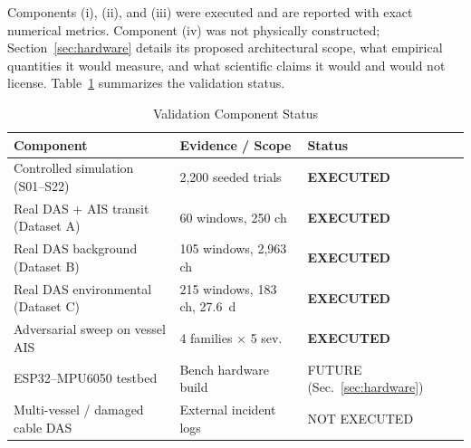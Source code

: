 \documentclass[conference]{IEEEtran}
\begin{document}
Components (i), (ii), and (iii) were executed and are reported with exact
numerical metrics. Component (iv) was not physically constructed;
Section~\ref{sec:hardware} details its proposed architectural scope, what
empirical quantities it would measure, and what scientific claims it would and
would not license. Table~\ref{tab:status} summarizes the validation status.

\begin{table}[!t]
\caption{Validation Component Status}
\label{tab:status}
\centering
\footnotesize
\begin{tabular}{@{}p{}p{}l@{}}
\toprule
Component & Evidence / Scope & Status \\
\midrule
Controlled simulation (S01--S22) & 2{,}200 seeded trials & \textbf{EXECUTED} \\
Real DAS + AIS transit (Dataset A) & 60 windows, 250 ch & \textbf{EXECUTED} \\
Real DAS background (Dataset B) & 105 windows, 2{,}963 ch & \textbf{EXECUTED} \\
Real DAS environmental (Dataset C) & 215 windows, 183 ch, 27.6~d & \textbf{EXECUTED} \\
Adversarial sweep on vessel AIS & 4 families $\times$ 5 sev. & \textbf{EXECUTED} \\
ESP32--MPU6050 testbed & Bench hardware build & FUTURE (Sec.~\ref{sec:hardware}) \\
Multi-vessel / damaged cable DAS & External incident logs & NOT EXECUTED \\
\bottomrule
\end{tabular}
\end{table}
\end{document}
